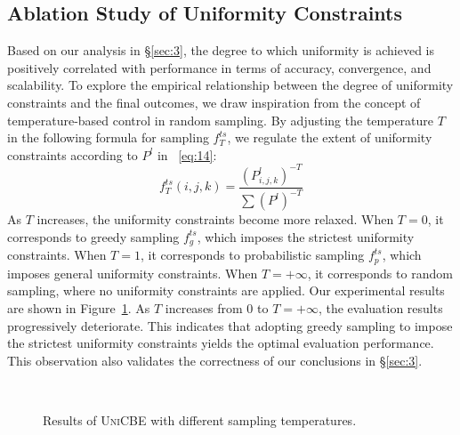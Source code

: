 \subsection{Ablation Study of Uniformity Constraints}
Based on our analysis in \S\ref{sec:3}, the degree to which uniformity is achieved is positively correlated with performance in terms of accuracy, convergence, and scalability. To explore the empirical relationship between the degree of uniformity constraints and the final outcomes, we draw inspiration from the concept of temperature-based control in random sampling. By adjusting the temperature $T$ in the following formula for sampling $f^{ts}_T$, we regulate the extent of uniformity constraints according to $P^l$ in ~\eqref{eq:14}:
\begin{equation}
    f^{ts}_T(i,j,k) =\frac{(P^l_{i,j,k})^{-T}}{\sum (P^{l})^{-T}}
\end{equation}
As \(T\) increases, the uniformity constraints become more relaxed. When \(T=0\), it corresponds to greedy sampling \(f^{ts}_g\), which imposes the strictest uniformity constraints. When \(T=1\), it corresponds to probabilistic sampling \(f^{ts}_p\), which imposes general uniformity constraints. When \(T=+\infty\), it corresponds to random sampling, where no uniformity constraints are applied. 
Our experimental results are shown in Figure~\ref{fig:T}. 
As \(T\) increases from 0 to \(T=+\infty\), the evaluation results progressively deteriorate. This indicates that adopting greedy sampling to impose the strictest uniformity constraints yields the optimal evaluation performance. This observation also validates the correctness of our conclusions in \S\ref{sec:3}.

\begin{figure}[h]
    \centering
    \hfill
    \hfill
     \vspace{-0.2cm}\\
    \hfill
    \hfill
    \vspace{-0.2cm}
    \caption{Results of \textsc{UniCBE} with different sampling temperatures. }
    \vspace{-0.4cm}
    \label{fig:T}
\end{figure}

